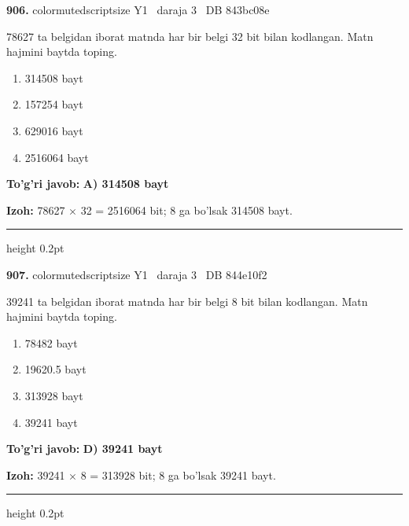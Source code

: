 \documentclass[10pt,a4paper,oneside]{article}
\begin{document}
\noindent\textbf{\color{ink}906.}  {color{muted}scriptsize Y1 \textbullet\ daraja 3 \textbullet\ DB 843bc08e}
\par
78627 ta belgidan iborat matnda har bir belgi 32 bit bilan kodlangan. Matn hajmini baytda toping.
\begin{enumerate}[label=\Alph*),leftmargin=9mm]
\item 314508 bayt
\item 157254 bayt
\item 629016 bayt
\item 2516064 bayt
\end{enumerate}
\begin{tcolorbox}[enhanced,breakable,colback=teal!4,colframe=teal!50!black,boxrule=0.5pt,arc=1.1mm,left=3mm,right=3mm,top=1.7mm,bottom=1.7mm,before skip=2mm,after skip=2mm]
\textbf{\color{teal}To'g'ri javob:} \textbf{A) 314508 bayt}
\par\smallskip
\textbf{Izoh:} 78627 \ensuremath{\times} 32 = 2516064 bit; 8 ga bo'lsak 314508 bayt.
\end{tcolorbox}
\vspace{2mm}\hrule height 0.2pt \vspace{3mm}

\noindent\textbf{\color{ink}907.}  {color{muted}scriptsize Y1 \textbullet\ daraja 3 \textbullet\ DB 844e10f2}
\par
39241 ta belgidan iborat matnda har bir belgi 8 bit bilan kodlangan. Matn hajmini baytda toping.
\begin{enumerate}[label=\Alph*),leftmargin=9mm]
\item 78482 bayt
\item 19620.5 bayt
\item 313928 bayt
\item 39241 bayt
\end{enumerate}
\begin{tcolorbox}[enhanced,breakable,colback=teal!4,colframe=teal!50!black,boxrule=0.5pt,arc=1.1mm,left=3mm,right=3mm,top=1.7mm,bottom=1.7mm,before skip=2mm,after skip=2mm]
\textbf{\color{teal}To'g'ri javob:} \textbf{D) 39241 bayt}
\par\smallskip
\textbf{Izoh:} 39241 \ensuremath{\times} 8 = 313928 bit; 8 ga bo'lsak 39241 bayt.
\end{tcolorbox}
\vspace{2mm}\hrule height 0.2pt \vspace{3mm}
\end{document}
